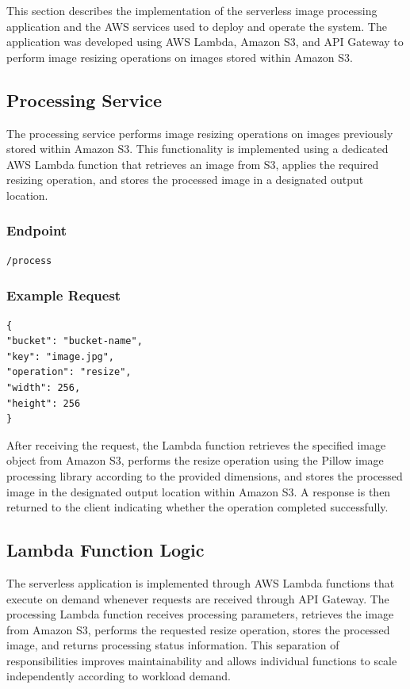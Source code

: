 \documentclass[11pt,a4paper,twocolumn]{article}
\begin{document}
This section describes the implementation of the serverless image processing application and the AWS services used to deploy 
and operate the system. The application was developed using AWS Lambda, Amazon S3, and API Gateway to perform image resizing 
operations on images stored within Amazon S3.


\subsection{Processing Service}

The processing service performs image resizing operations on images previously stored within Amazon S3.
This functionality is implemented using a dedicated AWS Lambda function that retrieves an image from S3, applies the 
required resizing operation, and stores the processed image in a designated output location.

\subsubsection*{Endpoint}

\begin{verbatim}
/process
\end{verbatim}

\subsubsection*{Example Request}

\begin{verbatim}
{
"bucket": "bucket-name",
"key": "image.jpg",
"operation": "resize",
"width": 256,
"height": 256
}
\end{verbatim}

After receiving the request, the Lambda function retrieves the specified image object from Amazon S3, performs the resize operation using the Pillow image processing library according to the provided dimensions, and stores the processed image in the designated output location within Amazon S3.
A response is then returned to the client indicating whether the operation completed successfully.

\subsection{Lambda Function Logic}

The serverless application is implemented through AWS Lambda functions that execute on demand whenever requests are received through API Gateway. The processing Lambda function receives processing parameters, retrieves the image from Amazon S3, performs the requested resize operation, stores the processed image, and returns processing status information. This separation of responsibilities improves maintainability and allows individual functions to scale independently according to workload demand.
\end{document}
